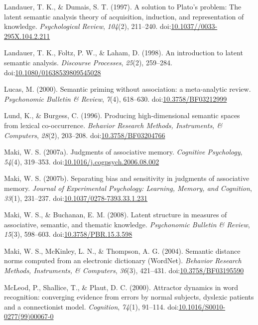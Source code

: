 \documentclass[english,man]{apa6}
\theoremstyle{definition}
\theoremstyle{definition}
\theoremstyle{definition}
\theoremstyle{remark}
\begin{document}
\hypertarget{ref-Landauer1997}{}
Landauer, T. K., \& Dumais, S. T. (1997). A solution to Plato's problem:
The latent semantic analysis theory of acquisition, induction, and
representation of knowledge. \emph{Psychological Review}, \emph{104}(2),
211--240.
doi:\href{https://doi.org/10.1037//0033-295X.104.2.211}{10.1037//0033-295X.104.2.211}

\hypertarget{ref-Landauer1998}{}
Landauer, T. K., Foltz, P. W., \& Laham, D. (1998). An introduction to
latent semantic analysis. \emph{Discourse Processes}, \emph{25}(2),
259--284.
doi:\href{https://doi.org/10.1080/01638539809545028}{10.1080/01638539809545028}

\hypertarget{ref-Lucas2000}{}
Lucas, M. (2000). Semantic priming without association: a meta-analytic
review. \emph{Psychonomic Bulletin \& Review}, \emph{7}(4), 618--630.
doi:\href{https://doi.org/10.3758/BF03212999}{10.3758/BF03212999}

\hypertarget{ref-Lund1996}{}
Lund, K., \& Burgess, C. (1996). Producing high-dimensional semantic
spaces from lexical co-occurrence. \emph{Behavior Research Methods,
Instruments, \& Computers}, \emph{28}(2), 203--208.
doi:\href{https://doi.org/10.3758/BF03204766}{10.3758/BF03204766}

\hypertarget{ref-Maki2007a}{}
Maki, W. S. (2007a). Judgments of associative memory. \emph{Cognitive
Psychology}, \emph{54}(4), 319--353.
doi:\href{https://doi.org/10.1016/j.cogpsych.2006.08.002}{10.1016/j.cogpsych.2006.08.002}

\hypertarget{ref-Maki2007}{}
Maki, W. S. (2007b). Separating bias and sensitivity in judgments of
associative memory. \emph{Journal of Experimental Psychology: Learning,
Memory, and Cognition}, \emph{33}(1), 231--237.
doi:\href{https://doi.org/10.1037/0278-7393.33.1.231}{10.1037/0278-7393.33.1.231}

\hypertarget{ref-Maki2008}{}
Maki, W. S., \& Buchanan, E. M. (2008). Latent structure in measures of
associative, semantic, and thematic knowledge. \emph{Psychonomic
Bulletin \& Review}, \emph{15}(3), 598--603.
doi:\href{https://doi.org/10.3758/PBR.15.3.598}{10.3758/PBR.15.3.598}

\hypertarget{ref-Maki2004}{}
Maki, W. S., McKinley, L. N., \& Thompson, A. G. (2004). Semantic
distance norms computed from an electronic dictionary (WordNet).
\emph{Behavior Research Methods, Instruments, \& Computers},
\emph{36}(3), 421--431.
doi:\href{https://doi.org/10.3758/BF03195590}{10.3758/BF03195590}

\hypertarget{ref-McLeod2000}{}
McLeod, P., Shallice, T., \& Plaut, D. C. (2000). Attractor dynamics in
word recognition: converging evidence from errors by normal subjects,
dyslexic patients and a connectionist model. \emph{Cognition},
\emph{74}(1), 91--114.
doi:\href{https://doi.org/10.1016/S0010-0277(99)00067-0}{10.1016/S0010-0277(99)00067-0}
\end{document}
